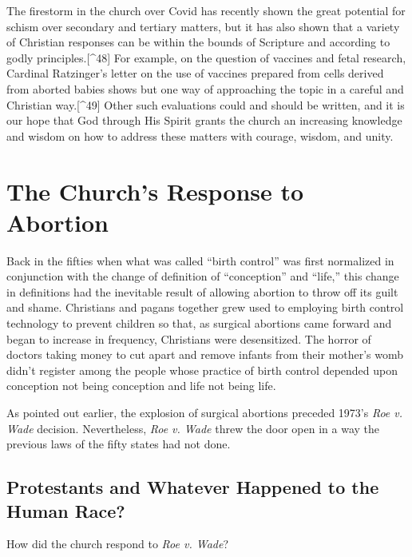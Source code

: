 \documentclass[
]{book}
\begin{document}
The firestorm in the church over Covid has recently shown the great potential for schism over secondary and tertiary matters, but it has also shown that a variety of Christian responses can be within the bounds of Scripture and according to godly principles.{[}\^{}48{]} For example, on the question of vaccines and fetal research, Cardinal Ratzinger's letter on the use of vaccines prepared from cells derived from aborted babies shows but one way of approaching the topic in a careful and Christian way.{[}\^{}49{]} Other such evaluations could and should be written, and it is our hope that God through His Spirit grants the church an increasing knowledge and wisdom on how to address these matters with courage, wisdom, and unity.

\hypertarget{the-churchs-response-to-abortion}{%
\section{The Church's Response to Abortion}\label{the-churchs-response-to-abortion}}

Back in the fifties when what was called ``birth control'' was first normalized in conjunction with the change of definition of ``conception'' and ``life,'' this change in definitions had the inevitable result of allowing abortion to throw off its guilt and shame. Christians and pagans together grew used to employing birth control technology to prevent children so that, as surgical abortions came forward and began to increase in frequency, Christians were desensitized. The horror of doctors taking money to cut apart and remove infants from their mother's womb didn't register among the people whose practice of birth control depended upon conception not being conception and life not being life.

As pointed out earlier, the explosion of surgical abortions preceded 1973's \emph{Roe v. Wade} decision. Nevertheless, \emph{Roe v. Wade} threw the door open in a way the previous laws of the fifty states had not done.

\hypertarget{protestants-and-whatever-happened-to-the-human-race}{%
\subsection{Protestants and Whatever Happened to the Human Race?}\label{protestants-and-whatever-happened-to-the-human-race}}

How did the church respond to \emph{Roe v. Wade}?
\end{document}
